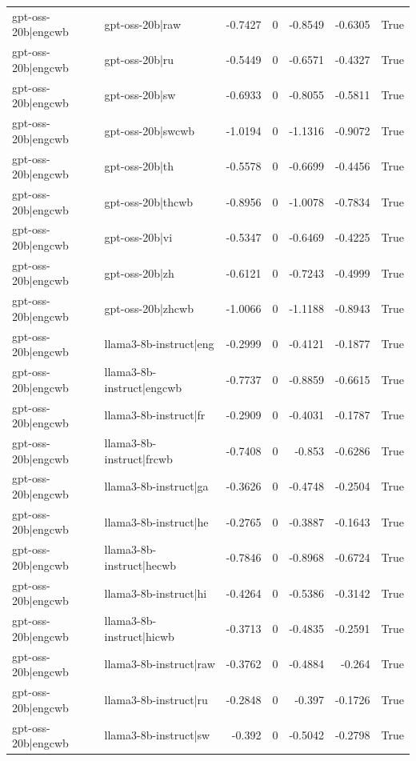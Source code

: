 \begin{table}
\begin{tabular}{l l r r r r l}
gpt-oss-20b|engcwb & gpt-oss-20b|raw & -0.7427 & 0 & -0.8549 & -0.6305 & True \\
gpt-oss-20b|engcwb & gpt-oss-20b|ru & -0.5449 & 0 & -0.6571 & -0.4327 & True \\
gpt-oss-20b|engcwb & gpt-oss-20b|sw & -0.6933 & 0 & -0.8055 & -0.5811 & True \\
gpt-oss-20b|engcwb & gpt-oss-20b|swcwb & -1.0194 & 0 & -1.1316 & -0.9072 & True \\
gpt-oss-20b|engcwb & gpt-oss-20b|th & -0.5578 & 0 & -0.6699 & -0.4456 & True \\
gpt-oss-20b|engcwb & gpt-oss-20b|thcwb & -0.8956 & 0 & -1.0078 & -0.7834 & True \\
gpt-oss-20b|engcwb & gpt-oss-20b|vi & -0.5347 & 0 & -0.6469 & -0.4225 & True \\
gpt-oss-20b|engcwb & gpt-oss-20b|zh & -0.6121 & 0 & -0.7243 & -0.4999 & True \\
gpt-oss-20b|engcwb & gpt-oss-20b|zhcwb & -1.0066 & 0 & -1.1188 & -0.8943 & True \\
gpt-oss-20b|engcwb & llama3-8b-instruct|eng & -0.2999 & 0 & -0.4121 & -0.1877 & True \\
gpt-oss-20b|engcwb & llama3-8b-instruct|engcwb & -0.7737 & 0 & -0.8859 & -0.6615 & True \\
gpt-oss-20b|engcwb & llama3-8b-instruct|fr & -0.2909 & 0 & -0.4031 & -0.1787 & True \\
gpt-oss-20b|engcwb & llama3-8b-instruct|frcwb & -0.7408 & 0 & -0.853 & -0.6286 & True \\
gpt-oss-20b|engcwb & llama3-8b-instruct|ga & -0.3626 & 0 & -0.4748 & -0.2504 & True \\
gpt-oss-20b|engcwb & llama3-8b-instruct|he & -0.2765 & 0 & -0.3887 & -0.1643 & True \\
gpt-oss-20b|engcwb & llama3-8b-instruct|hecwb & -0.7846 & 0 & -0.8968 & -0.6724 & True \\
gpt-oss-20b|engcwb & llama3-8b-instruct|hi & -0.4264 & 0 & -0.5386 & -0.3142 & True \\
gpt-oss-20b|engcwb & llama3-8b-instruct|hicwb & -0.3713 & 0 & -0.4835 & -0.2591 & True \\
gpt-oss-20b|engcwb & llama3-8b-instruct|raw & -0.3762 & 0 & -0.4884 & -0.264 & True \\
gpt-oss-20b|engcwb & llama3-8b-instruct|ru & -0.2848 & 0 & -0.397 & -0.1726 & True \\
gpt-oss-20b|engcwb & llama3-8b-instruct|sw & -0.392 & 0 & -0.5042 & -0.2798 & True \\

\end{tabular}
\end{table}
